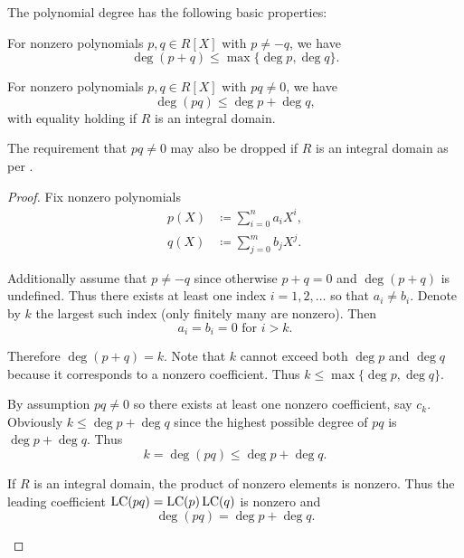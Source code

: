 \begin{proposition}\label{thm:polynomial_degree_properties}
  The polynomial degree has the following basic properties:
  \begin{propenum}
     For nonzero polynomials \( p, q \in R[X] \) with \( p \neq -q \), we have
    \begin{equation*}
      \deg (p + q) \leq \max \{ \deg p, \deg q \}.
    \end{equation*}

     For nonzero polynomials \( p, q \in R[X] \) with \( pq \neq 0 \), we have
    \begin{equation*}
      \deg (pq) \leq \deg p + \deg q,
    \end{equation*}
    with equality holding if \( R \) is an integral domain.

    The requirement that \( pq \neq 0 \) may also be dropped if \( R \) is an integral domain as per .
  \end{propenum}
\end{proposition}
\begin{proof}
  Fix nonzero polynomials
  \begin{align*}
    p(X) &\coloneqq \sum_{i=0}^n a_i X^i, \\
    q(X) &\coloneqq \sum_{j=0}^m b_j X^j.
  \end{align*}

  \begin{description}
     Additionally assume that \( p \neq -q \) since otherwise \( p + q = 0 \) and \( \deg(p + q) \) is undefined. Thus there exists at least one index \( i = 1, 2, \ldots \) so that \( a_i \neq b_i \). Denote by \( k \) the largest such index (only finitely many are nonzero). Then
    \begin{equation*}
      a_i = b_i = 0 \text{ for } i > k.
    \end{equation*}

    Therefore \( \deg(p + q) = k \). Note that \( k \) cannot exceed both \( \deg p \) and \( \deg q \) because it corresponds to a nonzero coefficient. Thus \( k \leq \max\{ \deg p, \deg q \} \).

     By assumption \( pq \neq 0 \) so there exists at least one nonzero coefficient, say \( c_k \). Obviously \( k \leq \deg p + \deg q \) since the highest possible degree of \( pq \) is \( \deg p + \deg q \). Thus
    \begin{equation*}
      k = \deg (pq) \leq \deg p + \deg q.
    \end{equation*}

    If \( R \) is an integral domain, the product of nonzero elements is nonzero. Thus the leading coefficient \( \operatorname{LC}(pq) = \operatorname{LC}(p)\operatorname{LC}(q) \) is nonzero and
    \begin{equation*}
      \deg(pq) = \deg p + \deg q.
    \end{equation*}
  \end{description}
\end{proof}

